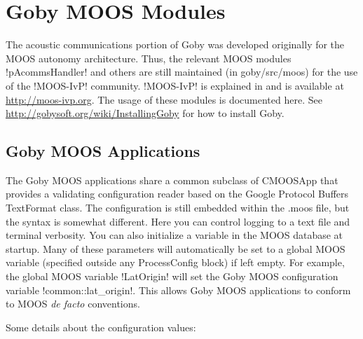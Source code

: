 \chapter{Goby MOOS Modules}\label{chap:MOOS}
\MakeShortVerb{\!} %

The acoustic communications portion of Goby was developed originally for the MOOS autonomy architecture. Thus, the relevant MOOS modules !pAcommsHandler! and others are still maintained (in goby/src/moos) for the use of the !MOOS-IvP! community. !MOOS-IvP! is explained in \cite{moos-ivp-jfr} and is available at \url{http://moos-ivp.org}. The usage of these modules is documented here. See \url{http://gobysoft.org/wiki/InstallingGoby} for how to install Goby.


\section{Goby MOOS Applications} \label{sec:goby_moos_app}

The Goby MOOS applications share a common subclass of CMOOSApp that provides a validating configuration reader based on the Google Protocol Buffers TextFormat class. The configuration is still embedded within the .moos file, but the syntax is somewhat different. Here you can control logging to a text file and terminal verbosity. You can also initialize a variable in the MOOS database at startup. Many of these parameters will automatically be set to a global MOOS variable (specified outside any ProcessConfig block) if left empty. For example, the global MOOS variable !LatOrigin! will set the Goby MOOS configuration variable !common::lat_origin!. This allows Goby MOOS applications to conform to MOOS \textit{de facto} conventions.

\resetbvlinenumber

Some details about the configuration values:

